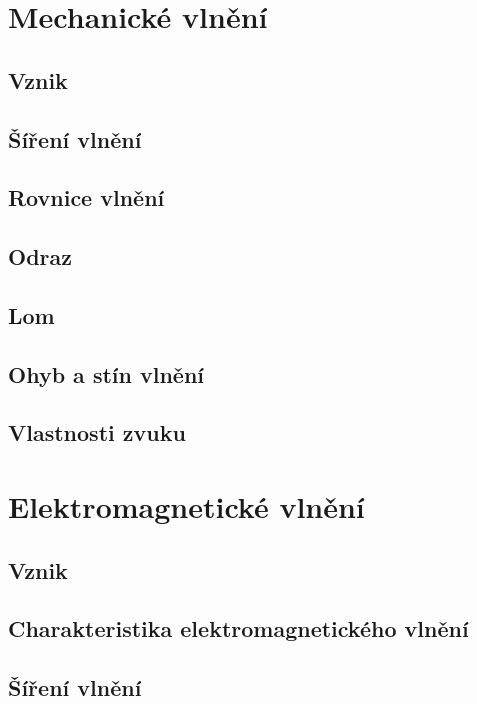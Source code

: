 \documentclass[titlepage]{book}
\begin{document}
\chapter{Mechanické vlnění}

\section{Vznik}

\section{Šíření vlnění}

\section{Rovnice vlnění}

\section{Odraz}

\section{Lom}

\section{Ohyb a stín vlnění}

\section{Vlastnosti zvuku}

\chapter{Elektromagnetické vlnění}

\section{Vznik}

\section{Charakteristika elektromagnetického vlnění}

\section{Šíření vlnění}
\end{document}
